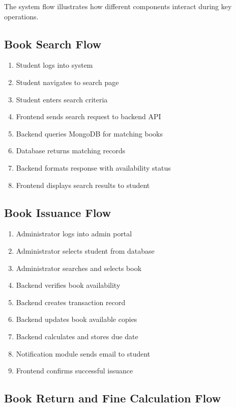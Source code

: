 \documentclass[12pt,a4paper]{report}
\begin{document}
The system flow illustrates how different components interact during key operations.

\subsection{Book Search Flow}

\begin{enumerate}
    \item Student logs into system
    \item Student navigates to search page
    \item Student enters search criteria
    \item Frontend sends search request to backend API
    \item Backend queries MongoDB for matching books
    \item Database returns matching records
    \item Backend formats response with availability status
    \item Frontend displays search results to student
\end{enumerate}

\subsection{Book Issuance Flow}

\begin{enumerate}
    \item Administrator logs into admin portal
    \item Administrator selects student from database
    \item Administrator searches and selects book
    \item Backend verifies book availability
    \item Backend creates transaction record
    \item Backend updates book available copies
    \item Backend calculates and stores due date    
    \item Notification module sends email to student
    \item Frontend confirms successful issuance
\end{enumerate}

\subsection{Book Return and Fine Calculation Flow}
\end{document}
